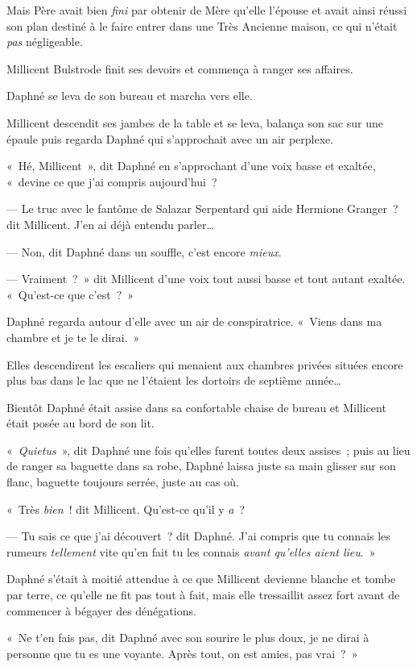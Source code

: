 Mais Père avait bien \emph{fini} par obtenir de Mère qu'elle l'épouse et avait ainsi réussi son plan destiné à le faire entrer dans une Très Ancienne maison, ce qui n'était \emph{pas} négligeable.

Millicent Bulstrode finit ses devoirs et commença à ranger ses affaires.

Daphné se leva de son bureau et marcha vers elle.

Millicent descendit ses jambes de la table et se leva, balança son sac sur une épaule puis regarda Daphné qui s'approchait avec un air perplexe.

«~Hé, Millicent~», dit Daphné en s'approchant d'une voix basse et exaltée, «~devine ce que j'ai compris aujourd'hui~?

--- Le truc avec le fantôme de Salazar Serpentard qui aide Hermione Granger~? dit Millicent.
J'en ai déjà entendu parler…

--- Non, dit Daphné dans un souffle, c'est encore \emph{mieux}.

--- Vraiment~?~»
dit Millicent d'une voix tout aussi basse et tout autant exaltée.
«~Qu'est-ce que c'est~?~»

Daphné regarda autour d'elle avec un air de conspiratrice.
«~Viens dans ma chambre et je te le dirai.~»

Elles descendirent les escaliers qui menaient aux chambres privées situées encore plus bas dans le lac que ne l'étaient les dortoirs de septième année…

Bientôt Daphné était assise dans sa confortable chaise de bureau et Millicent était posée au bord de son lit.

«~\emph{Quietus}~», dit Daphné une fois qu'elles furent toutes deux assises~; puis au lieu de ranger sa baguette dans sa robe, Daphné laissa juste sa main glisser sur son flanc, baguette toujours serrée, juste au cas où.

«~Très \emph{bien}~! dit Millicent.
Qu'est-ce qu'il y \emph{a}~?

--- Tu sais ce que j'ai découvert~? dit Daphné.
J'ai compris que tu connais les rumeurs \emph{tellement} vite qu'en fait tu les connais \emph{avant qu'elles aient lieu}.~»

Daphné s'était à moitié attendue à ce que Millicent devienne blanche et tombe par terre, ce qu'elle ne fit pas tout à fait, mais elle tressaillit assez fort avant de commencer à bégayer des dénégations.

«~Ne t'en fais pas, dit Daphné avec son sourire le plus doux, je ne dirai à personne que tu es une voyante.
Après tout, on est amies, pas vrai~?~»

